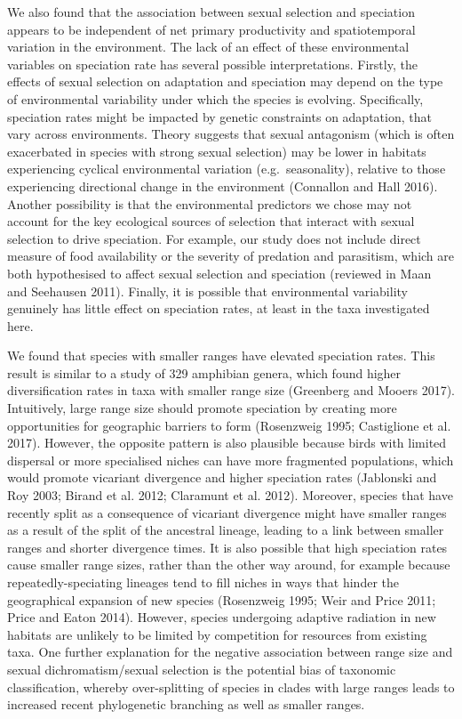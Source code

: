 \documentclass[]{article}
\begin{document}
We also found that the association between sexual selection and
speciation appears to be independent of net primary productivity and
spatiotemporal variation in the environment. The lack of an effect of
these environmental variables on speciation rate has several possible
interpretations. Firstly, the effects of sexual selection on adaptation
and speciation may depend on the type of environmental variability under
which the species is evolving. Specifically, speciation rates might be
impacted by genetic constraints on adaptation, that vary across
environments. Theory suggests that sexual antagonism (which is often
exacerbated in species with strong sexual selection) may be lower in
habitats experiencing cyclical environmental variation
(e.g.~seasonality), relative to those experiencing directional change in
the environment (Connallon and Hall 2016). Another possibility is that
the environmental predictors we chose may not account for the key
ecological sources of selection that interact with sexual selection to
drive speciation. For example, our study does not include direct measure
of food availability or the severity of predation and parasitism, which
are both hypothesised to affect sexual selection and speciation
(reviewed in Maan and Seehausen 2011). Finally, it is possible that
environmental variability genuinely has little effect on speciation
rates, at least in the taxa investigated here.

We found that species with smaller ranges have elevated speciation
rates. This result is similar to a study of 329 amphibian genera, which
found higher diversification rates in taxa with smaller range size
(Greenberg and Mooers 2017). Intuitively, large range size should
promote speciation by creating more opportunities for geographic
barriers to form (Rosenzweig 1995; Castiglione et al. 2017). However,
the opposite pattern is also plausible because birds with limited
dispersal or more specialised niches can have more fragmented
populations, which would promote vicariant divergence and higher
speciation rates (Jablonski and Roy 2003; Birand et al. 2012; Claramunt
et al. 2012). Moreover, species that have recently split as a
consequence of vicariant divergence might have smaller ranges as a
result of the split of the ancestral lineage, leading to a link between
smaller ranges and shorter divergence times. It is also possible that
high speciation rates cause smaller range sizes, rather than the other
way around, for example because repeatedly-speciating lineages tend to
fill niches in ways that hinder the geographical expansion of new
species (Rosenzweig 1995; Weir and Price 2011; Price and Eaton 2014).
However, species undergoing adaptive radiation in new habitats are
unlikely to be limited by competition for resources from existing taxa.
One further explanation for the negative association between range size
and sexual dichromatism/sexual selection is the potential bias of
taxonomic classification, whereby over-splitting of species in clades
with large ranges leads to increased recent phylogenetic branching as
well as smaller ranges.
\end{document}
